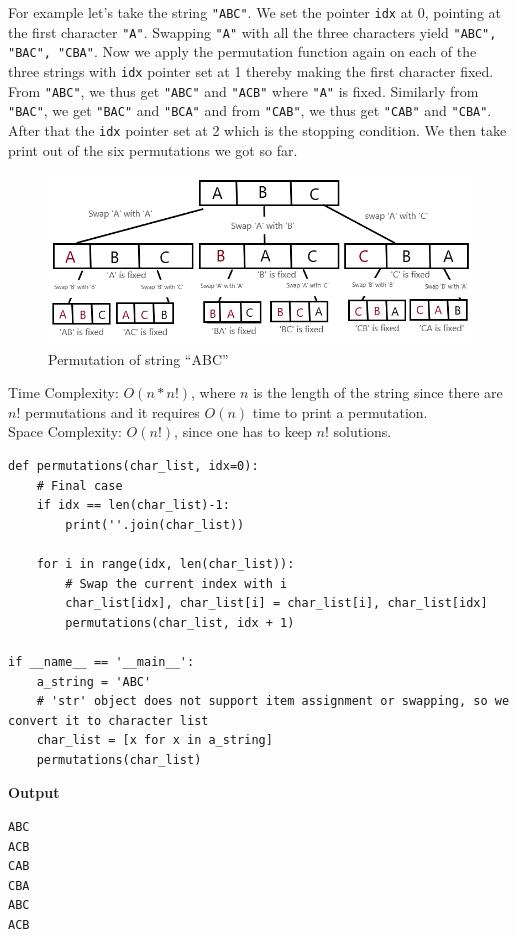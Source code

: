 \documentclass[a4paper,11pt]{book}
\begin{document}
\noindent For example let's take the string \lstinline{"ABC"}. We set the pointer \lstinline{idx} at 0, pointing at the first character \lstinline{"A"}. Swapping \lstinline{"A"} with all the three characters yield \lstinline{"ABC", "BAC", "CBA"}. Now we apply the permutation function again on each of the three strings with \lstinline{idx} pointer set at 1 thereby making the first character fixed. From \lstinline{"ABC"}, we thus get \lstinline{"ABC"} and \lstinline{"ACB"} where \lstinline{"A"} is fixed. Similarly from \lstinline{"BAC"}, we get \lstinline{"BAC"} and \lstinline{"BCA"} and from \lstinline{"CAB"}, we thus get \lstinline{"CAB"} and \lstinline{"CBA"}. After that the \lstinline{idx} pointer set at 2 which is the stopping condition. We then take print out of the six permutations we got so far.
\begin{figure}[ht]
	\centering
	\includegraphics[scale=0.45]{code/sort/pic/recursiontreeabc.png}
	\caption{Permutation of string ``ABC''}
\end{figure}
\vspace{5mm}

\noindent Time Complexity: $O(n * n!)$, where $n$ is the length of the string since there are $n!$ permutations and it requires $O(n)$ time to print a permutation.\\
Space Complexity: $O(n!)$, since one has to keep $n!$ solutions.

\begin{lstlisting}
def permutations(char_list, idx=0):
    # Final case
    if idx == len(char_list)-1:
        print(''.join(char_list))
 
    for i in range(idx, len(char_list)):
        # Swap the current index with i
        char_list[idx], char_list[i] = char_list[i], char_list[idx]
        permutations(char_list, idx + 1)
 
if __name__ == '__main__':
    a_string = 'ABC'
    # 'str' object does not support item assignment or swapping, so we convert it to character list
    char_list = [x for x in a_string]
    permutations(char_list)
\end{lstlisting}
\textbf{Output}
\begin{lstlisting}
ABC
ACB
CAB
CBA
ABC
ACB
\end{lstlisting}
\end{document}
